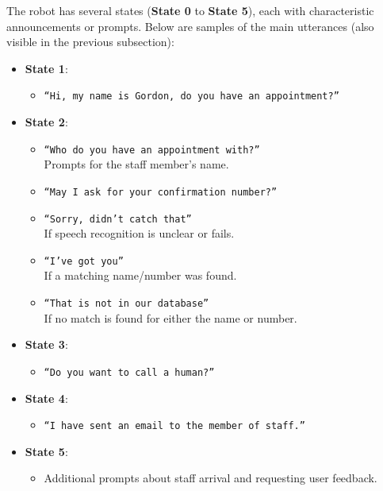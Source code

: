 \documentclass[conference]{IEEEtran}
\begin{document}
The robot has several states (\textbf{State 0} to \textbf{State 5}), each with characteristic announcements or prompts. Below are samples of the main utterances (also visible in the previous subsection):

\begin{itemize}
  \item \textbf{State 1}:
    \begin{itemize}
      \item \texttt{``Hi, my name is Gordon, do you have an appointment?''} \\
    \end{itemize}

  \item \textbf{State 2}:
    \begin{itemize}
      \item \texttt{``Who do you have an appointment with?''} \\
            Prompts for the staff member’s name.
      \item \texttt{``May I ask for your confirmation number?''}
      \item \texttt{``Sorry, didn't catch that''} \\
            If speech recognition is unclear or fails.
      \item \texttt{``I've got you''} \\
            If a matching name/number was found.
      \item \texttt{``That is not in our database''} \\
            If no match is found for either the name or number.
    \end{itemize}

  \item \textbf{State 3}:
    \begin{itemize}
      \item \texttt{``Do you want to call a human?''}
    \end{itemize}

  \item \textbf{State 4}:
    \begin{itemize}
      \item \texttt{``I have sent an email to the member of staff.''} \\
    \end{itemize}

  \item \textbf{State 5}:
    \begin{itemize}
      \item Additional prompts about staff arrival and requesting user feedback.
    \end{itemize}
\end{itemize}
\end{document}

